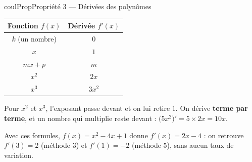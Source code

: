 \documentclass[11pt,a4paper]{article}
\makeatletter
\newcounter{lycee@signet}
\newcommand{\signet}[3][]{\stepcounter{lycee@signet}%
  \edef\lycee@dest{\if\relax\detokenize{#1}\relax
    signet.\arabic{lycee@signet}\else#1\fi}%
  \hypertarget{\lycee@dest}{}\bookmark[level=#2,dest=\lycee@dest]{#3}}
\newenvironment{proprietebox}[1][Propriété]%
  {\begin{boitecours}[phantom={\signet{2}{#1}}]{coulProp}{#1}}{\end{boitecours}}
\makeatother
\begin{document}
\begin{proprietebox}[Propriété 3 --- Dérivées des polynômes]
\begin{center}
\renewcommand{\arraystretch}{1.8}\setlength{\tabcolsep}{14pt}
\begin{tabular}{|c|c|}
\hline
\textbf{Fonction} $f(x)$ & \textbf{Dérivée} $f'(x)$\\
\hline
$k$ (un nombre) & $0$\\
\hline
$x$ & $1$\\
\hline
$mx+p$ & $m$\\
\hline
$x^{2}$ & $2x$\\
\hline
$x^{3}$ & $3x^{2}$\\
\hline
\end{tabular}
\end{center}
Pour $x^{2}$ et $x^{3}$, l'exposant passe devant et on lui retire $1$.
On dérive \textbf{terme par terme}, et un nombre qui multiplie reste devant :
$\big(5x^{2}\big)'=5\times 2x=10x$.
\end{proprietebox}

\begin{remarquebox}
Avec ces formules, $f(x)=x^{2}-4x+1$ donne $f'(x)=2x-4$ : on retrouve $f'(3)=2$
(méthode 3) et $f'(1)=-2$ (méthode 5), sans aucun taux de variation.
\end{remarquebox}
\end{document}
